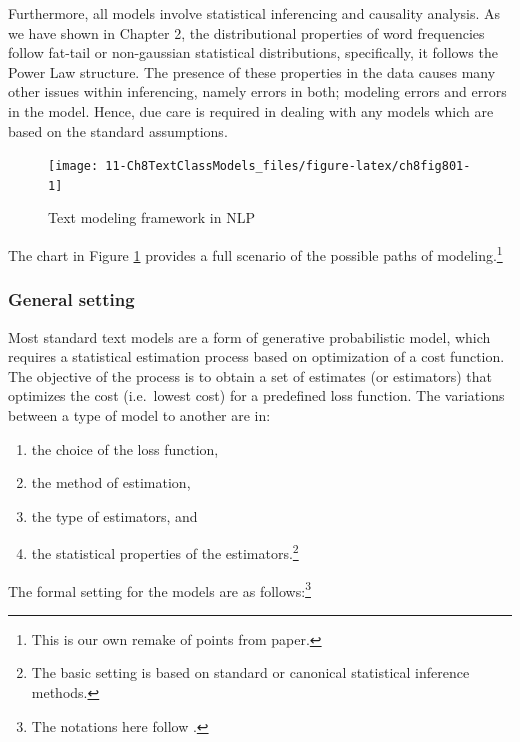\documentclass[
]{article}
\providecommand{\tightlist}{%
  \setlength{\itemsep}{0pt}\setlength{\parskip}{0pt}}
\begin{document}
Furthermore, all models involve statistical inferencing and causality analysis. As we have shown in Chapter 2, the distributional properties of word frequencies follow fat-tail or non-gaussian statistical distributions, specifically, it follows the Power Law structure. The presence of these properties in the data causes many other issues within inferencing, namely errors in both; modeling errors and errors in the model. Hence, due care is required in dealing with any models which are based on the standard assumptions.

\begin{figure}

{\centering \texttt{[image: 11-Ch8TextClassModels\_files/figure-latex/ch8fig801-1]} 

}

\caption{Text modeling framework in NLP}\label{fig:ch8fig801}
\end{figure}

The chart in Figure \ref{fig:ch8fig801} provides a full scenario of the possible paths of modeling.\footnote{This is our own remake of points from \citep{grimmer2013} paper.}

\hypertarget{general-setting}{%
\subsubsection{General setting}\label{general-setting}}

Most standard text models are a form of generative probabilistic model, which requires a statistical estimation process based on optimization of a cost function. The objective of the process is to obtain a set of estimates (or estimators) that optimizes the cost (i.e.~lowest cost) for a predefined loss function. The variations between a type of model to another are in:

\begin{enumerate}
\def\labelenumi{\alph{enumi})}
\tightlist
\item
  the choice of the loss function,
\item
  the method of estimation,
\item
  the type of estimators, and
\item
  the statistical properties of the estimators.\footnote{The basic setting is based on standard or canonical statistical inference methods.}
\end{enumerate}

The formal setting for the models are as follows:\footnote{The notations here follow \citep{blei2003}.}
\end{document}

